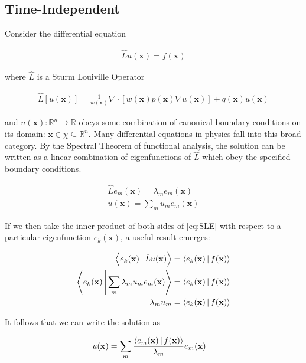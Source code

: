 \documentclass[11pt]{article}
\theoremstyle{plain}
\theoremstyle{definition}
\renewcommand{\vec}[1]{\mathbf{#1}} %
\begin{document}
\subsection{Time-Independent}

Consider the differential equation

\begin{align}
    \hat L u(\vec x) = f(\vec x) \label{eq:SLE}
\end{align}

where $\hat L$ is a Sturm Louiville Operator

\begin{align}
    \hat L \left[ u\left( \vec x \right) \right] = \frac{1}{w(\vec x)} \nabla \cdot \left[ w(\vec x) p(\vec x) \nabla u(\vec x) \right] + q(\vec x)u(\vec x)
\end{align}

and $u(\vec x): \mathbb{R}^n \rightarrow \mathbb{R}$ obeys some combination of canonical boundary conditions on its domain: $\vec x \in \chi \subseteq \mathbb{R}^n$. Many differential equations in physics fall into this broad category. By the Spectral Theorem of functional analysis, the solution can be written as a linear combination of eigenfunctions of $\hat L$ which obey the specified boundary conditions.

\begin{align}
    \hat L e_m(\vec x) = \lambda_m e_m(\vec x) \\
    u(\vec x) = \sum\limits_m u_m e_m(\vec x)
\end{align}

If we then take the inner product of both sides of \eqref{eq:SLE} with respect to a particular eigenfunction $e_k(\vec x)$, a useful result emerges:

\begin{align}
    \Braket{e_k(\vec x) | \hat L u(\vec x)} &= \Braket{e_k(\vec x) | f(\vec x)} \\
    \Braket{e_k(\vec x) | \sum\limits_m \lambda_m u_m e_m(\vec x)} &= \Braket{e_k(\vec x) | f(\vec x)} \\
    \lambda_m u_m &= \Braket{e_k(\vec x) | f(\vec x)}
\end{align}

It follows that we can write the solution as

\begin{align}
    u(\vec x) &= \sum\limits_m \frac{\Braket{e_m(\vec x) | f(\vec x)}}{\lambda_m} e_m(\vec x)
\end{align}
\end{document}
